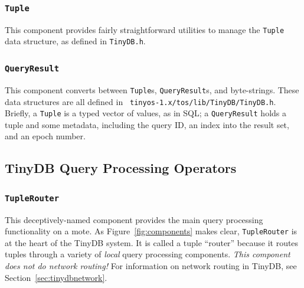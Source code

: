 \documentclass[11pt]{article}
\newcommand{\docroot}{tinyos-1.x}
\begin{document}

\subsubsection{\tt Tuple}
This component provides fairly straightforward utilities to manage the
{\tt Tuple} data structure, as defined in {\tt TinyDB.h}.

\subsubsection {\tt QueryResult}
This component converts between {\tt Tuple}s, {\tt QueryResult}s,
and byte-strings.  These data structures are all defined in {\tt
\docroot/tos/lib/TinyDB/TinyDB.h}.  Briefly, a {\tt Tuple} is a typed vector
of values, as in SQL; a {\tt QueryResult} holds a tuple and some
metadata, including the query ID, an index into the result set, and an
epoch number.



\subsection{TinyDB Query Processing Operators}
\label{sec:qp}
\subsubsection {\tt TupleRouter}
This deceptively-named component provides the main query processing
functionality on a mote.  As Figure~\ref{fig:components} makes clear,
{\tt TupleRouter} is at the heart of the TinyDB system.  It is called
a tuple ``router'' because it routes tuples through a variety of {\em
local} query processing components.
{\em This component does not do network
routing!}  For information on network routing in TinyDB, see 
 Section~\ref{sec:tinydbnetwork}.
\end{document}
